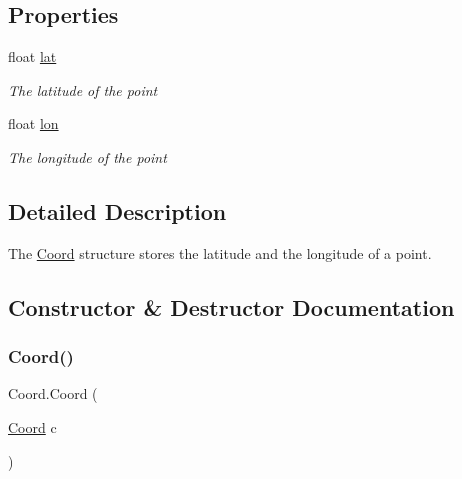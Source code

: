 \subsection*{Properties}
\begin{DoxyCompactItemize}
\item 
float \hyperlink{structCoord_adee2cdba9052e04aa6056c8e05900736}{lat}
\begin{DoxyCompactList}\small\item\em The latitude of the point\end{DoxyCompactList}\item 
float \hyperlink{structCoord_a11d9174715f32a5728e029fc4a32aaa2}{lon}
\begin{DoxyCompactList}\small\item\em The longitude of the point\end{DoxyCompactList}\end{DoxyCompactItemize}


\subsection{Detailed Description}
The \hyperlink{structCoord}{Coord} structure stores the latitude and the longitude of a point. 



\subsection{Constructor \& Destructor Documentation}
\mbox{\label{structCoord_ac64010b7110b871868064d853b09435a}} 
\subsubsection{\texorpdfstring{Coord()}{Coord()}\hspace{0.1cm}{\footnotesize\ttfamily [1/2]}}
{\footnotesize\ttfamily Coord.\+Coord (\begin{DoxyParamCaption}\item[{\hyperlink{structCoord}{Coord}}]{c }\end{DoxyParamCaption})\hspace{0.3cm}{\ttfamily [inline]}}



